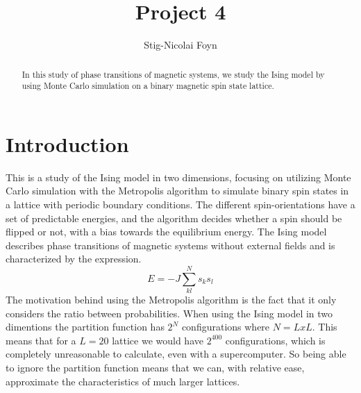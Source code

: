 \documentclass{emulateapj}
\begin{document}
\title{Project 4}

\author{Stig-Nicolai Foyn}




\begin{abstract}
In this study of phase transitions of magnetic systems, we study the Ising model by using Monte Carlo simulation on a binary magnetic spin state lattice.
\end{abstract}


\section{Introduction}
\label{sec:introduction}
This is a study of the Ising model in two dimensions, focusing on utilizing Monte Carlo simulation with the Metropolis algorithm to simulate binary spin states in a lattice with periodic boundary conditions. The different spin-orientations have a set of predictable energies, and the algorithm decides whether a spin should be flipped or not, with a bias towards the equilibrium energy. The Ising model describes phase transitions of magnetic systems without external fields and is characterized by the expression.
%
\begin{equation*}
    E = -J \sum_{kl}^{N} s_{k}s_{l}
\end{equation*}
%
The motivation behind using the Metropolis algorithm is the fact that it only considers the ratio between probabilities. When using the Ising model in two dimentions the partition function has $2^N$ configurations where $N = LxL$. This means that for a $L = 20$ lattice we would have $2^400$ configurations, which is completely unreasonable to calculate, even with a supercomputer. So being able to ignore the partition function means that we can, with relative ease, approximate the characteristics of much larger lattices.

\end{document}
